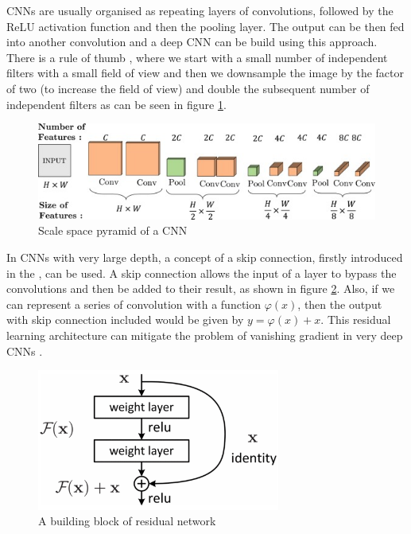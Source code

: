 CNNs are usually organised as repeating layers of convolutions, followed by the ReLU activation function and then the pooling layer. The output can be then fed into another convolution and a deep CNN can be build using this approach. There is a rule of thumb \cite{Santosh2022-3}, where we start with a small number of independent filters with a small field of view and then we downsample the image by the factor of two (to increase the field of view) and double the subsequent number of independent filters as can be seen in figure \ref{fig:cnn-layers}.

\begin{figure}[H]
\begin{centering}
\includegraphics[width=12cm]{assets/images/cnn-layers.jpg}
\par\end{centering}
\caption{Scale space pyramid of a CNN \cite{Santosh2022-3}}
\label{fig:cnn-layers}
\end{figure}

In CNNs with very large depth, a concept of a skip connection, firstly introduced in the \cite{He2016}, can be used. A skip connection allows the input of a layer to bypass the convolutions and then be added to their result, as shown in figure \ref{fig:skip-conn}. Also, if we can represent a series of convolution with a function $\varphi(x)$, then the output with skip connection included would be given by $y=\varphi(x) + x$. This residual learning architecture can mitigate the problem of vanishing gradient in very deep CNNs \cite{Santosh2022-2}.

\begin{figure}[H]
\begin{centering}
\includegraphics[width=8cm]{assets/images/skip-conn.png}
\par\end{centering}
\caption{A building block of residual network \cite{He2016}}
\label{fig:skip-conn}
\end{figure}

